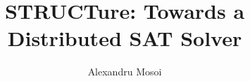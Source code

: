 \documentclass[a4paper]{report}
\begin{document}
\title{STRUCTure: Towards a Distributed SAT Solver}
\author{Alexandru Mosoi}

\maketitle
\tableofcontents














\appendix

\end{document}
